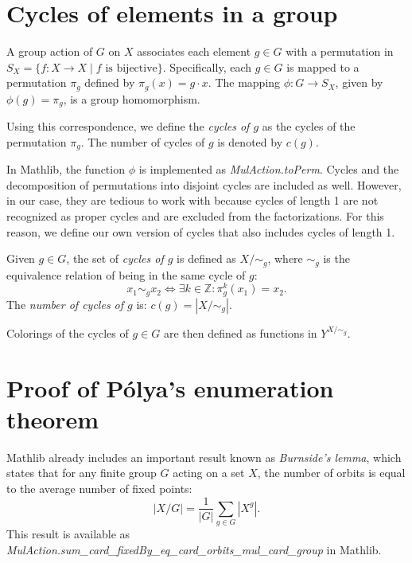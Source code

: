 \section{Cycles of elements in a group}

A group action of $G$ on $X$ associates each element $g \in G$ with a permutation in $S_X = \{f : X \to X \mid f \text{ is bijective}\}$. Specifically, each $g \in G$ is mapped to a permutation $\pi_g$ defined by $\pi_g(x) = g \cdot x$. The mapping $\phi : G \to S_X$, given by $\phi(g) = \pi_g$, is a group homomorphism. 

Using this correspondence, we define the \emph{cycles of $g$} as the cycles of the permutation $\pi_g$. The number of cycles of $g$ is denoted by $c(g)$.

In Mathlib, the function $\phi$ is implemented as \emph{MulAction.toPerm}. Cycles and the decomposition of permutations into disjoint cycles are included as well. However, in our case, they are tedious to work with because cycles of length 1 are not recognized as proper cycles and are excluded from the factorizations. For this reason, we define our own version of cycles that also includes cycles of length 1.

\begin{definition}
  \label{def:cycles-of-group}
  \leanok
  Given $g \in G$, the set of \emph{cycles of $g$} is defined as $X / \sim_g$, where $\sim_g$ is the equivalence relation of being in the same cycle of $g$:
  \begin{equation*}
    x_1 \sim_g x_2 \iff \exists k \in \mathbb{Z}: \pi_g^k(x_1) = x_2.
  \end{equation*}
  The \emph{number of cycles of $g$} is: $c(g) = |X / \sim_g|$.
\end{definition}

Colorings of the cycles of $g \in G$ are then defined as functions in $Y^{X / \sim_g}$.

\section{Proof of Pólya's enumeration theorem}

Mathlib already includes an important result known as \emph{Burnside's lemma}, which states that for any finite group $G$ acting on a set $X$, the number of orbits is equal to the average number of fixed points:
\begin{equation*}
  |X/G| = \frac{1}{|G|} \sum_{g \in G} |X^g|.
\end{equation*}
This result is available as \emph{MulAction.sum\_card\_fixedBy\_eq\_card\_orbits\_mul\_card\_group} in Mathlib.

